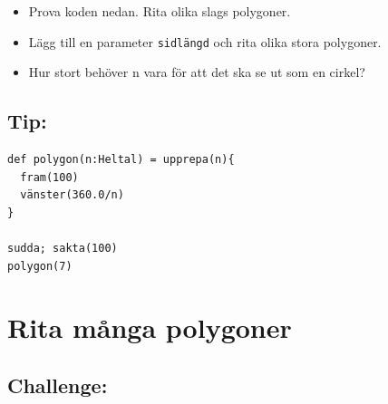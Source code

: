 \begin{itemize}

\item {Prova koden nedan. Rita olika slags polygoner.}
\item {Lägg till en parameter \lstinline{sidlängd} och rita olika stora polygoner.}
\item {Hur stort behöver n vara för att det ska se ut som en cirkel?}

\end{itemize}


\section*{\color{OliveGreen}Tip:}

\begin{lstlisting}[basicstyle={\ttfamily\fontsize{18}{22}\selectfont},numbers=none]
def polygon(n:Heltal) = upprepa(n){
  fram(100)
  vänster(360.0/n)
}

sudda; sakta(100)
polygon(7)
\end{lstlisting}
        

  
\chapter{Rita många polygoner}\section*{\color{BrickRed}Challenge:}



